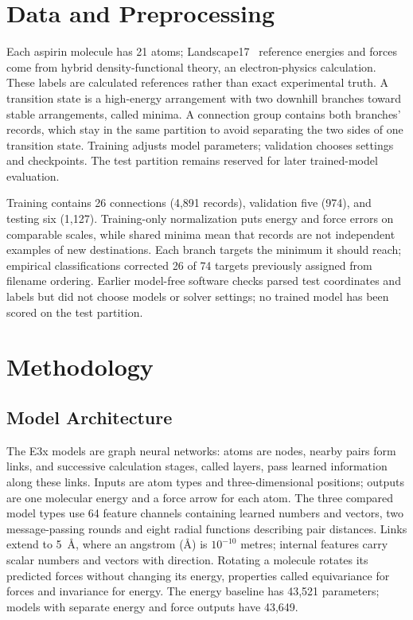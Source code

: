 \documentclass{article}
\begin{document}
\section{Data and Preprocessing}
Each aspirin molecule has 21 atoms; Landscape17~\cite{landscape} reference energies and forces come from hybrid density-functional theory, an electron-physics calculation. These labels are calculated references rather than exact experimental truth. A transition state is a high-energy arrangement with two downhill branches toward stable arrangements, called minima. A connection group contains both branches' records, which stay in the same partition to avoid separating the two sides of one transition state. Training adjusts model parameters; validation chooses settings and checkpoints. The test partition remains reserved for later trained-model evaluation.

Training contains 26 connections (4,891 records), validation five (974), and testing six (1,127). Training-only normalization puts energy and force errors on comparable scales, while shared minima mean that records are not independent examples of new destinations. Each branch targets the minimum it should reach; empirical classifications corrected 26 of 74 targets previously assigned from filename ordering. Earlier model-free software checks parsed test coordinates and labels but did not choose models or solver settings; no trained model has been scored on the test partition.
\section{Methodology}
\subsection{Model Architecture}
The E3x models are graph neural networks: atoms are nodes, nearby pairs form links, and successive calculation stages, called layers, pass learned information along these links. Inputs are atom types and three-dimensional positions; outputs are one molecular energy and a force arrow for each atom. The three compared model types use 64 feature channels containing learned numbers and vectors, two message-passing rounds and eight radial functions describing pair distances. Links extend to 5~\AA, where an angstrom (\AA) is $10^{-10}$ metres; internal features carry scalar numbers and vectors with direction. Rotating a molecule rotates its predicted forces without changing its energy, properties called equivariance for forces and invariance for energy. The energy baseline has 43,521 parameters; models with separate energy and force outputs have 43,649.
\end{document}

